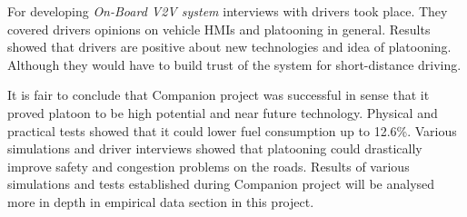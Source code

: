 % 
% 
For developing \emph{On-Board V2V system} interviews with drivers took place. They covered drivers opinions on vehicle HMIs and platooning in general. Results showed that drivers are positive about new technologies and idea of platooning. Although they would have to build trust of the system for short-distance driving.\par
% 
% 
% 
It is fair to conclude that Companion project was successful in sense that it proved platoon to be high potential and near future technology. Physical and practical tests showed that it could lower fuel consumption up to 12.6\%. Various simulations and driver interviews showed that platooning could drastically improve safety and congestion problems on the roads. Results of various simulations and tests established during Companion project will be analysed more in depth in empirical data section in this project.
% 
% 
% 